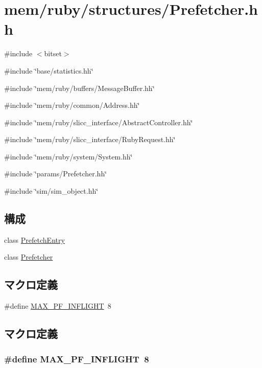 \hypertarget{Prefetcher_8hh}{
\section{mem/ruby/structures/Prefetcher.hh}
\label{Prefetcher_8hh}
}
{\ttfamily \#include $<$bitset$>$}\par
{\ttfamily \#include \char`\"{}base/statistics.hh\char`\"{}}\par
{\ttfamily \#include \char`\"{}mem/ruby/buffers/MessageBuffer.hh\char`\"{}}\par
{\ttfamily \#include \char`\"{}mem/ruby/common/Address.hh\char`\"{}}\par
{\ttfamily \#include \char`\"{}mem/ruby/slicc\_\-interface/AbstractController.hh\char`\"{}}\par
{\ttfamily \#include \char`\"{}mem/ruby/slicc\_\-interface/RubyRequest.hh\char`\"{}}\par
{\ttfamily \#include \char`\"{}mem/ruby/system/System.hh\char`\"{}}\par
{\ttfamily \#include \char`\"{}params/Prefetcher.hh\char`\"{}}\par
{\ttfamily \#include \char`\"{}sim/sim\_\-object.hh\char`\"{}}\par
\subsection*{構成}
\begin{DoxyCompactItemize}
\item 
class \hyperlink{classPrefetchEntry}{PrefetchEntry}
\item 
class \hyperlink{classPrefetcher}{Prefetcher}
\end{DoxyCompactItemize}
\subsection*{マクロ定義}
\begin{DoxyCompactItemize}
\item 
\#define \hyperlink{Prefetcher_8hh_a3f538565a1611925be3c57c2b35bbcfd}{MAX\_\-PF\_\-INFLIGHT}~8
\end{DoxyCompactItemize}


\subsection{マクロ定義}
\hypertarget{Prefetcher_8hh_a3f538565a1611925be3c57c2b35bbcfd}{
\subsubsection[{MAX\_\-PF\_\-INFLIGHT}]{\setlength{\rightskip}{0pt plus 5cm}\#define MAX\_\-PF\_\-INFLIGHT~8}}
\label{Prefetcher_8hh_a3f538565a1611925be3c57c2b35bbcfd}
